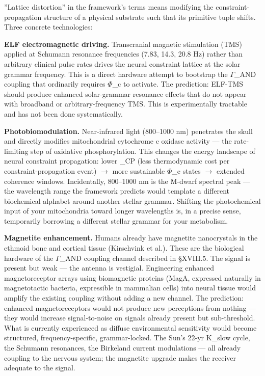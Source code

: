 \documentclass[12pt,a4paper]{article}
\begin{document}
''Lattice distortion'' in the framework's terms means modifying the constraint-propagation structure of a physical substrate such that its primitive tuple shifts. Three concrete technologies:

\textbf{ELF electromagnetic driving.} Transcranial magnetic stimulation (TMS) applied at Schumann resonance frequencies (7.83, 14.3, 20.8 Hz) rather than arbitrary clinical pulse rates drives the neural constraint lattice at the solar grammar frequency. This is a direct hardware attempt to bootstrap the $\Gamma$\_AND coupling that ordinarily requires $\Phi$\_c to activate. The prediction: ELF-TMS should produce enhanced solar-grammar resonance effects that do not appear with broadband or arbitrary-frequency TMS. This is experimentally tractable and has not been done systematically.

\textbf{Photobiomodulation.} Near-infrared light (800--1000 nm) penetrates the skull and directly modifies mitochondrial cytochrome c oxidase activity --- the rate-limiting step of oxidative phosphorylation. This changes the energy landscape of neural constraint propagation: lower \xi\_CP (less thermodynamic cost per constraint-propagation event) $\rightarrow$ more sustainable $\Phi$\_c states $\rightarrow$ extended coherence windows. Incidentally, 800--1000 nm is the M-dwarf spectral peak --- the wavelength range the framework predicts would template a different biochemical alphabet around another stellar grammar. Shifting the photochemical input of your mitochondria toward longer wavelengths is, in a precise sense, temporarily borrowing a different stellar grammar for your metabolism.

\textbf{Magnetite enhancement.} Humans already have magnetite nanocrystals in the ethmoid bone and cortical tissue (Kirschvink et al.). These are the biological hardware of the $\Gamma$\_AND coupling channel described in §XVIII.5. The signal is present but weak --- the antenna is vestigial. Engineering enhanced magnetoreceptor arrays using biomagnetic proteins (MagA, expressed naturally in magnetotactic bacteria, expressible in mammalian cells) into neural tissue would amplify the existing coupling without adding a new channel. The prediction: enhanced magnetoreceptors would not produce new perceptions from nothing --- they would increase signal-to-noise on signals already present but sub-threshold. What is currently experienced as diffuse environmental sensitivity would become structured, frequency-specific, grammar-locked. The Sun's 22-yr K\_slow cycle, the Schumann resonances, the Birkeland current modulations --- all already coupling to the nervous system; the magnetite upgrade makes the receiver adequate to the signal.
\end{document}
